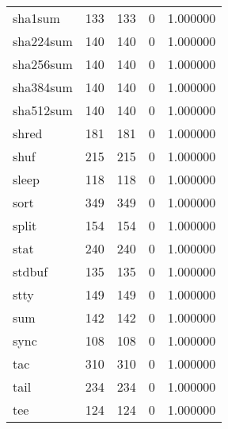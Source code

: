 \begin{longtable}{lrrrr}
sha1sum   &                     133 &              133 &                 0 &                     1.000000 \\
sha224sum &                     140 &              140 &                 0 &                     1.000000 \\
sha256sum &                     140 &              140 &                 0 &                     1.000000 \\
sha384sum &                     140 &              140 &                 0 &                     1.000000 \\
sha512sum &                     140 &              140 &                 0 &                     1.000000 \\
shred     &                     181 &              181 &                 0 &                     1.000000 \\
shuf      &                     215 &              215 &                 0 &                     1.000000 \\
sleep     &                     118 &              118 &                 0 &                     1.000000 \\
sort      &                     349 &              349 &                 0 &                     1.000000 \\
split     &                     154 &              154 &                 0 &                     1.000000 \\
stat      &                     240 &              240 &                 0 &                     1.000000 \\
stdbuf    &                     135 &              135 &                 0 &                     1.000000 \\
stty      &                     149 &              149 &                 0 &                     1.000000 \\
sum       &                     142 &              142 &                 0 &                     1.000000 \\
sync      &                     108 &              108 &                 0 &                     1.000000 \\
tac       &                     310 &              310 &                 0 &                     1.000000 \\
tail      &                     234 &              234 &                 0 &                     1.000000 \\
tee       &                     124 &              124 &                 0 &                     1.000000 \\

\end{longtable}
